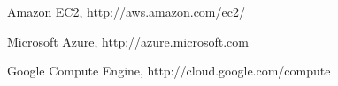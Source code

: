 \documentclass[twoside]{article}
\begin{document}
\begin{multicols}{2}
\begin{thebibliography}{99} %

Amazon EC2, http://aws.amazon.com/ec2/

Microsoft Azure, http://azure.microsoft.com

Google Compute Engine, http://cloud.google.com/compute

\end{thebibliography}


\end{multicols}
\end{document}
